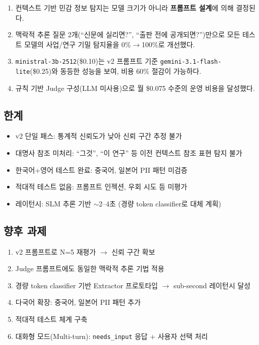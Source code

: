\documentclass[11pt,a4paper]{article}
\begin{document}
\begin{enumerate}[nosep]
  \item 컨텍스트 기반 민감 정보 탐지는 모델 크기가 아니라 \textbf{프롬프트 설계}에 의해 결정된다.
  \item 맥락적 추론 질문 2개(``신문에 실리면?'', ``출판 전에 공개되면?'')만으로 모든 테스트 모델의 사업/연구 기밀 탐지율을 0\%$\rightarrow$100\%로 개선했다.
  \item \texttt{ministral-3b-2512}(\$0.10)는 v2 프롬프트 기준 \texttt{gemini-3.1-flash-lite}(\$0.25)와 동등한 성능을 보여, 비용 60\% 절감이 가능하다.
  \item 규칙 기반 Judge 구성(LLM 미사용)으로 월 \$0.075 수준의 운영 비용을 달성했다.
\end{enumerate}

\subsection{한계}

\begin{itemize}[nosep]
  \item v2 단일 패스: 통계적 신뢰도가 낮아 신뢰 구간 추정 불가
  \item 대명사 참조 미처리: ``그것'', ``이 연구'' 등 이전 컨텍스트 참조 표현 탐지 불가
  \item 한국어+영어 테스트 완료: 중국어, 일본어 PII 패턴 미검증
  \item 적대적 테스트 없음: 프롬프트 인젝션, 우회 시도 등 미평가
  \item 레이턴시: SLM 추론 기반 $\sim$2--4초 (경량 token classifier로 대체 계획)
\end{itemize}

\subsection{향후 과제}

\begin{enumerate}[nosep]
  \item v2 프롬프트로 N=5 재평가 $\rightarrow$ 신뢰 구간 확보
  \item Judge 프롬프트에도 동일한 맥락적 추론 기법 적용
  \item 경량 token classifier 기반 Extractor 프로토타입 $\rightarrow$ sub-second 레이턴시 달성
  \item 다국어 확장: 중국어, 일본어 PII 패턴 추가
  \item 적대적 테스트 체계 구축
  \item 대화형 모드(Multi-turn): \texttt{needs\_input} 응답 + 사용자 선택 처리
\end{enumerate}
\end{document}
